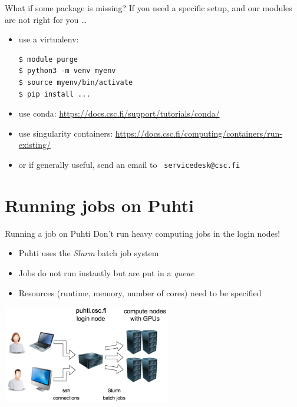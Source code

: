 \documentclass[aspectratio=1610,14pt]{beamer}
\newcommand{\link}[1]{\alert{\url{#1}}}
\newcommand{\vitem}{\vfill\item}
\begin{document}
\begin{frame}[fragile]{What if some package is missing?}
  If you need a specific setup, and our modules are not right for you \ldots
  \begin{itemize}
  \vitem use a virtualenv:
\begin{verbatim}
$ module purge
$ python3 -m venv myenv
$ source myenv/bin/activate
$ pip install ...
\end{verbatim}

  \vitem use conda: {\small \link{https://docs.csc.fi/support/tutorials/conda/}}
  \vitem use singularity containers: {\small \link{https://docs.csc.fi/computing/containers/run-existing/}}
    
  \vitem or if generally useful, send an email to \alert{\tt
      servicedesk@csc.fi}
  \end{itemize}
  
\end{frame}

\section{Running jobs on Puhti}

\begin{frame}{Running a job on Puhti}
  \alert{Don't run heavy computing jobs in the login nodes!}
  \vspace{2mm}
  \begin{itemize}
  \item Puhti uses the \emph{Slurm} batch job system
  \item Jobs do not run instantly but are put in a \emph{queue}
  \item Resources (runtime, memory, number of cores) need to be specified
  \end{itemize}

  \vspace{-4mm}
  \begin{center}
    \includegraphics[width=0.55\textwidth]{slurm1.png}    
  \end{center}
\end{frame}
\end{document}

